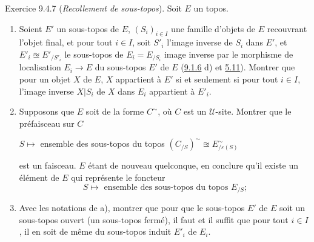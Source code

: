 \documentclass[10pt]{../fichiers-configuration-latex/smfart}
\begin{document}
\begin{enonce*}[remark]{Exercice 9.4.7}
(\emph{Recollement de sous-topos}). Soit $E$ un topos.
\begin{enumerate}
\renewcommand{\theenumi}{\alph{enumi}}
\renewcommand{\labelenumi}{\theenumi)}
\item Soient $E'$ un sous-topos de $E$, $(S_i)_{i\in I}$ une famille
d'objets de $E$ recouvrant l'objet final, et pour tout $i\in I$,
soit $S'_i$ l'image inverse de $S_i$ dans $E'$, et $E'_i\approxeq
E'_{/S'_i}$ le sous-topos de $E_i=E_{/S_i}$ image inverse par le
morphisme de localisation $E_i\rightarrow E$ du sous-topos $E'$ de
$E$ (\hyperref[IV.exer9.1.6]{9.1.6} d) et \hyperref[IV.prop5.11]{5.11}). Montrer que pour
un objet $X$ de $E$, $X$ appartient à $E'$ si et seulement si pour
tout $i\in I$, l'image inverse $X| S_i$ de $X$ dans $E_i$ appartient
à $E'_i$.

\item Supposons que $E$ soit de la forme $C^{\sim}$, où $C$ est un
$𝒰$-site. Montrer que le préfaisceau sur $C$
\begin{center}
$S\mapsto$ ensemble des sous-topos du topos
$(C_{/S})^{\sim}\approxeq E^{\sim}_{/\varepsilon(S)}$
\end{center}
est un faisceau. $E$ étant de nouveau quelconque, en conclure qu'il
existe un élément de $E$ qui représente le foncteur
$$
\text{$S\mapsto$ ensemble des sous-topos du topos $E_{/S}$;}
$$

\item Avec les notations de a), montrer que pour que le sous-topos
$E'$ de $E$ soit un sous-topos ouvert (\resp un sous-topos fermé),
il faut et il suffit que pour tout $i\in I$, il en soit de même du
sous-topos induit $E'_i$ de $E_i$.
\end{enumerate}
\end{enonce*}
\end{document}
